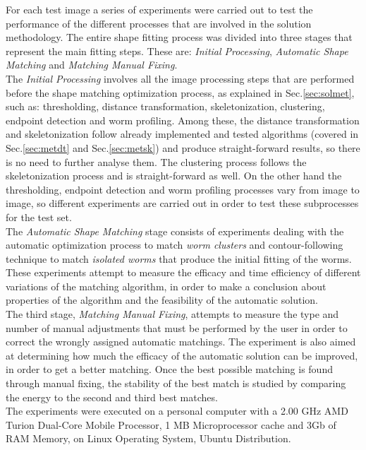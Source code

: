 For each test image a series of experiments were carried out to test the performance of
the different processes that are involved in the solution methodology. The entire 
shape fitting process was divided into three stages that represent the 
main fitting steps. These are: \emph{Initial Processing}, \emph{Automatic Shape Matching} and
\emph{Matching Manual Fixing}.\\

The \emph{Initial Processing} involves all the image processing steps that are performed 
before the shape matching optimization process, as explained in Sec.\ref{sec:solmet},
such as: thresholding, distance transformation, skeletonization, 
clustering, endpoint detection and worm profiling. Among these, the distance transformation
and skeletonization follow already implemented and tested algorithms (covered in Sec.\ref{sec:metdt}
and Sec.\ref{sec:metsk}) and produce straight-forward results, so there is no need to further analyse them.
The clustering process follows the skeletonization process and is straight-forward as well.
On the other hand the thresholding, endpoint detection and worm profiling processes vary 
from image to image, so different experiments are carried out in order to test these subprocesses
for the test set.\\

The \emph{Automatic Shape Matching} stage consists of experiments dealing with the automatic
optimization process to match \emph{worm clusters} and contour-following technique to match 
\emph{isolated worms} that produce the initial fitting of the worms. These 
experiments attempt to measure the efficacy and time efficiency of different variations of the
matching algorithm, in order to make a conclusion about properties of the algorithm and the feasibility 
of the automatic solution.\\
The third stage, \emph{Matching Manual Fixing}, attempts to measure the type and number of 
manual adjustments that must be performed by the user in order to correct the 
wrongly assigned automatic matchings. The experiment is also 
aimed at determining how much the efficacy of the automatic solution can be improved, in
order to get a better matching. Once the best possible matching is found through manual fixing,
the stability of the best match is studied by comparing the energy to the second and third best
matches.\\

The experiments were executed on a personal computer with a 2.00 GHz AMD Turion 
Dual-Core Mobile Processor, 1 MB Microprocessor cache and 3Gb of RAM Memory, 
on Linux Operating System, Ubuntu Distribution.

